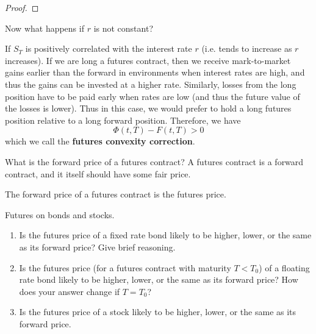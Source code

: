 \documentclass{article}
\begin{document}
    \begin{proof}
      
    \end{proof}

    Now what happens if $r$ is not constant? 

    \begin{definition}
      If $S_T$ is positively correlated with the interest rate $r$ (i.e. tends to increase as $r$ increases). If we are long a futures contract, then we receive mark-to-market gains earlier than the forward in environments when interest rates are high, and thus the gains can be invested at a higher rate. Similarly, losses from the long position have to be paid early when rates are low (and thus the future value of the losses is lower). Thus in this case, we would prefer to hold a long futures position relative to a long forward position. Therefore, we have 
      \begin{equation}
        \Phi (t, T) - F(t, T) > 0
      \end{equation}
      which we call the \textbf{futures convexity correction}.
    \end{definition}

    What is the forward price of a futures contract? A futures contract is a forward contract, and it itself should have some fair price.  

    \begin{theorem}
      The forward price of a futures contract is the futures price.
    \end{theorem}

    \begin{exercise}[Blyth 5.2]
      Futures on bonds and stocks. 
      \begin{enumerate}
        \item Is the futures price of a fixed rate bond likely to be higher, lower, or the same as its forward price? Give brief reasoning. 
        \item Is the futures price (for a futures contract with maturity $T < T_0$) of a floating rate bond likely to be higher, lower, or the same as its forward price? How does your answer change if $T = T_0$? 
        \item Is the futures price of a stock likely to be higher, lower, or the same as its forward price. 
      \end{enumerate}
    \end{exercise}
\end{document}
